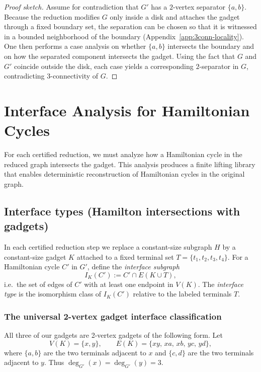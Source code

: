 \documentclass[12pt]{article}
\theoremstyle{definition}
\newcommand{\CtwoGadgetVertices}{2}
\begin{document}
\begin{proof}[Proof sketch]
Assume for contradiction that $G'$ has a $2$-vertex separator $\{a,b\}$.
Because the reduction modifies $G$ only inside a disk and attaches the gadget through a fixed boundary set, the separation can be chosen so that it is witnessed in a bounded neighborhood of the boundary (Appendix~\ref{app:3conn-locality}).
One then performs a case analysis on whether $\{a,b\}$ intersects the boundary and on how the separated component intersects the gadget.
Using the fact that $G$ and $G'$ coincide outside the disk, each case yields a corresponding $2$-separator in $G$, contradicting $3$-connectivity of $G$.
\end{proof}

\section{Interface Analysis for Hamiltonian Cycles}
\label{sec:interface-analysis}

For each certified reduction, we must analyze how a Hamiltonian cycle in the reduced graph intersects the gadget.
This analysis produces a finite lifting library that enables deterministic reconstruction of Hamiltonian cycles in the original graph.

\subsection{Interface types (Hamilton intersections with gadgets)}
\label{subsec:interface-types}

In each certified reduction step we replace a constant-size subgraph $H$ by a
constant-size gadget $K$ attached to a fixed terminal set $T=\{t_1,t_2,t_3,t_4\}$.
For a Hamiltonian cycle $C'$ in $G'$, define the \emph{interface subgraph}
\[
I_K(C') := C' \cap E(K\cup T),
\]
i.e.\ the set of edges of $C'$ with at least one endpoint in $V(K)$.
The \emph{interface type} is the isomorphism class of $I_K(C')$ relative to the
labeled terminals $T$.

\subsubsection{The universal \CtwoGadgetVertices-vertex gadget interface classification}
\label{subsubsec:2vertex-interface-classification}

All three of our gadgets are \CtwoGadgetVertices-vertex gadgets of the following form.
Let
\[
V(K)=\{x,y\},\qquad
E(K)=\{xy,\, xa,\, xb,\, yc,\, yd\},
\]
where $\{a,b\}$ are the two terminals adjacent to $x$ and $\{c,d\}$ are the two
terminals adjacent to $y$. Thus $\deg_{G'}(x)=\deg_{G'}(y)=3$.
\end{document}

